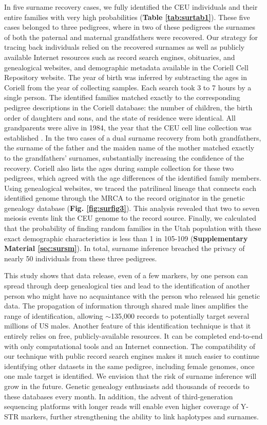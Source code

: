 In five surname recovery cases, we fully identified the CEU individuals and their entire families with very high probabilities (\textbf{Table \ref{tab:surtab1}}). These five cases belonged to three pedigrees, where in two of these pedigrees the surnames of both the paternal and maternal grandfathers were recovered. Our strategy for tracing back individuals relied on the recovered surnames as well as publicly available Internet resources such as record search engines, obituaries, and genealogical websites, and demographic metadata available in the Coriell Cell Repository website. The year of birth was inferred by subtracting the ages in Coriell from the year of collecting samples. Each search took 3 to 7 hours by a single person. The identified families matched exactly to the corresponding pedigree descriptions in the Coriell database: the number of children, the birth order of daughters and sons, and the state of residence were identical. All grandparents were alive in 1984, the year that the CEU cell line collection was established \cite{PrescottLalouelLeppert2008}. In the two cases of a dual surname recovery from both grandfathers, the surname of the father and the maiden name of the mother matched exactly to the grandfathers' surnames, substantially increasing the confidence of the recovery. Coriell also lists the ages during sample collection for these two pedigrees, which agreed with the age differences of the identified family members. Using genealogical websites, we traced the patrilineal lineage that connects each identified genome through the MRCA to the record originator in the genetic genealogy database (\textbf{Fig. \ref{fig:surfig3}}). This analysis revealed that two to seven meiosis events link the CEU genome to the record source. Finally, we calculated that the probability of finding random families in the Utah population with these exact demographic characteristics is less than 1 in 105-109 (\textbf{Supplementary Material \ref{sec:sursm}}). In total, surname inference breached the privacy of nearly 50 individuals from these three pedigrees.

This study shows that data release, even of a few markers, by one person can spread through deep genealogical ties and lead to the identification of another person who might have no acquaintance with the person who released his genetic data. The propagation of information through shared male lines amplifies the range of identification, allowing $\sim$135,000 records to potentially target several millions of US males. Another feature of this identification technique is that it entirely relies on free, publicly-available resources. It can be completed end-to-end with only computational tools and an Internet connection. The compatibility of our technique with public record search engines makes it much easier to continue identifying other datasets in the same pedigree, including female genomes, once one male target is identified.  We envision that the risk of surname inference will grow in the future. Genetic genealogy enthusiasts add thousands of records to these databases every month. In addition, the advent of third-generation sequencing platforms with longer reads will enable even higher coverage of Y-STR markers, further strengthening the ability to link haplotypes and surnames.

